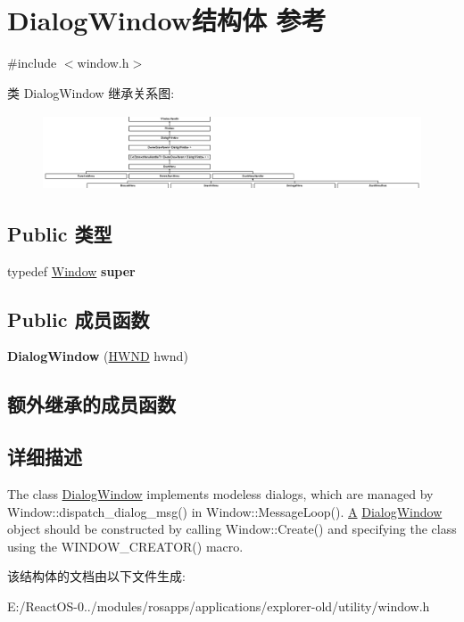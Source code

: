\hypertarget{struct_dialog_window}{}\section{Dialog\+Window结构体 参考}
\label{struct_dialog_window}


{\ttfamily \#include $<$window.\+h$>$}

类 Dialog\+Window 继承关系图\+:\begin{figure}[H]
\begin{center}
\leavevmode
\includegraphics[height=2.262626cm]{struct_dialog_window}
\end{center}
\end{figure}
\subsection*{Public 类型}
\begin{DoxyCompactItemize}
\item 
\mbox{\label{struct_dialog_window_a9703dec3c18abc088726aa0bb46bbeea}} 
typedef \hyperlink{struct_window}{Window} {\bfseries super}
\end{DoxyCompactItemize}
\subsection*{Public 成员函数}
\begin{DoxyCompactItemize}
\item 
\mbox{\label{struct_dialog_window_a523dd29818488da065f442886a66851d}} 
{\bfseries Dialog\+Window} (\hyperlink{interfacevoid}{H\+W\+ND} hwnd)
\end{DoxyCompactItemize}
\subsection*{额外继承的成员函数}


\subsection{详细描述}
The class \hyperlink{struct_dialog_window}{Dialog\+Window} implements modeless dialogs, which are managed by Window\+::dispatch\+\_\+dialog\+\_\+msg() in Window\+::\+Message\+Loop(). \hyperlink{struct_a}{A} \hyperlink{struct_dialog_window}{Dialog\+Window} object should be constructed by calling Window\+::\+Create() and specifying the class using the W\+I\+N\+D\+O\+W\+\_\+\+C\+R\+E\+A\+T\+O\+R() macro. 

该结构体的文档由以下文件生成\+:\begin{DoxyCompactItemize}
\item 
E\+:/\+React\+O\+S-\/0../modules/rosapps/applications/explorer-\/old/utility/window.\+h\end{DoxyCompactItemize}
